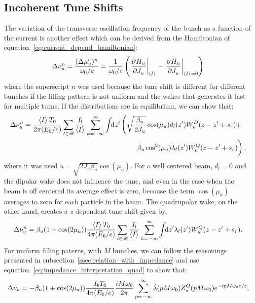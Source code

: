 \subsection{Incoherent Tune Shifts}\label{sec:incoherent_tune_shift}

    The variation of the transverse oscillation frequency of the bunch as a function of the current is another effect which can be derived from the Hamiltonian of equation~\eqref{eq:current_depend_hamiltonian}:
    \begin{align}
        \Delta\nu_u^n = \frac{(\Delta\mu'_u)^n}{\omega_0/c} = \frac{1}{\omega_0/c}\left(\left.\frac{\partial^{{}}H_n}{\partial J_u^{{}}}\right|_{\left\langle I \right\rangle_{{}}} - \left.\frac{\partial^{{}}H_n}{\partial J_u^{{}}}\right|_{\left\langle I \right\rangle_{{}}=0}\right)
    \end{align}
    where the superscript $n$ was used because the tune shift is different for different bunches if the filling pattern is not uniform and the wakes that generates it last for multiple turns. If the distributions are in equilibrium, we can show that:
    \begin{align}
        \Delta\nu_u^n = \frac{\average{I}T_0}{2\pi(E_0/e)}
        \sum_{l\in\mathscr{B}}\frac{I_l}{\average{I}}\sum_{k=-\infty}^\infty\udefint{z'}{
        &\left(\sqrt{\frac{\beta_u}{2J_u}}\cos(\mu_u)d_l(z') W^D_u(z-z' + s_r) +\right.\\
        &\left.\phantom{\sqrt{\frac{1_1}{1_1}}}\beta_u\cos^2(\mu_u)\lambda_l(z') W^Q_u(z-z' + s_r)\right)},
    \end{align}
    where it was used $u = \sqrt{2J_u\beta_u}\cos(\mu_u)$. For a well centered beam, $d_l=0$ and the dipolar wake does not influence the tune, and even in the case when the beam is off centered its average effect is zero, because the term $\cos(\mu_u)$ averages to zero for each particle in the beam. The quadrupolar wake, on the other hand, creates a $z$ dependent tune shift given by,
    \begin{align}
        \Delta\nu_u^n = \beta_u(1+\cos(2\mu_u))\frac{\left\langle I \right\rangle_{{}}T_0}{4\pi(E_0/e)}
        \sum_{l\in\mathscr{B}}\frac{I_l}{\left\langle I \right\rangle_{{}}}\sum_{k=-\infty}^\infty\int\!\!\text{d}z' 
        \lambda_l(z') W^Q_u(z-z' + s_r).
    \end{align}
    For uniform filling paterns, with $M$ bunches, we can follow the reasonings presented in subsection~\ref{ssec:relation_with_impedance} and use equation~\eqref{eq:impedance_interpretation_quad} to show that:
    \begin{align}
        \Delta\nu_u = -\beta_u(1+\cos(2\mu_u))\frac{I_bT_0}{4\pi(E_0/e)}
        \frac{iM\omega_0}{2\pi} \sum_{p=-\infty}^\infty \tilde{\lambda}(pM\omega_0)Z^Q_u(pM\omega_0)e^{-ipM\omega_0 z/c},
    \end{align}
